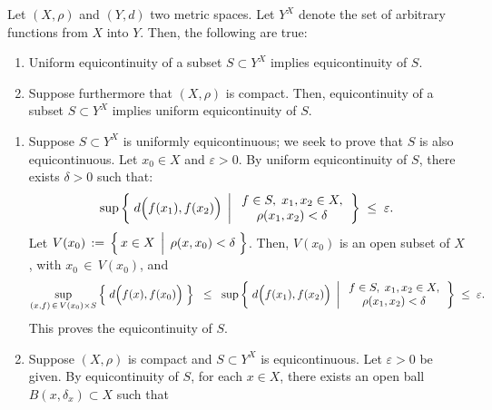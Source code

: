 \begin{proposition}
\mbox{}\vskip 0.2cm
\noindent
Let $(X,\rho)$ and $(Y,d)$ two metric spaces.
Let $Y^{X}$ denote the set of arbitrary functions from $X$ into $Y$.
Then, the following are true:
\begin{enumerate}
\item	Uniform equicontinuity of a subset $S \subset Y^{X}$ implies equicontinuity of $S$.
\item	Suppose furthermore that $(X,\rho)$ is compact.
		Then, equicontinuity of a subset $S \subset Y^{X}$ implies uniform equicontinuity of $S$.
\end{enumerate}
\end{proposition}
\proof
\begin{enumerate}
\item
	Suppose $S \subset Y^{X}$ is uniformly equicontinuous;
	we seek to prove that $S$ is also equicontinuous.
	Let $x_{0} \in X$ and $\varepsilon > 0$.
	By uniform equicontinuity of $S$, there exists $\delta > 0$ such that:
	\begin{equation*}
	\sup\left\{\;
	d\!\left(\overset{{\color{white}.}}{f}(x_{1}),f(x_{2})\right)
	\;\left\vert\;
	\begin{array}{c} f \in S, \; x_{1},x_{2} \in X, \\ \rho(x_{1},x_{2}) < \delta \end{array}
	\right.
	\right\}
	\;\leq\; \varepsilon.
	\end{equation*}
	Let $V(x_{0}) \,:=\, \left\{\,x \in X \;\left\vert\;\, \rho(x,x_{0}) \overset{{\color{white}.}}{<} \delta \right.\,\right\}$.
	Then, $V(x_{0})$ is an open subset of $X$, with $x_{0} \,\in\, V(x_{0})$, and
	\begin{equation*}
	\sup_{(x,f) \,\in\, V(x_{0}) \times S}\left\{\;d\!\left(\overset{{\color{white}.}}{f}(x),f(x_{0})\right)\;\right\}
	\;\; \leq \;\; 
	\sup\left\{\;
	d\!\left(\overset{{\color{white}.}}{f}(x_{1}),f(x_{2})\right)
	\;\left\vert\;
	\begin{array}{c} f \in S, \; x_{1},x_{2} \in X, \\ \rho(x_{1},x_{2}) < \delta \end{array}
	\right.
	\right\}
	\;\leq\; \varepsilon.
	\end{equation*}
	This proves the equicontinuity of $S$.
\item
	Suppose $(X,\rho)$ is compact and $S \subset Y^{X}$ is equicontinuous.
	Let $\varepsilon > 0$ be given.
	By equicontinuity of $S$, for each $x \in X$, there exists an open ball
	$B(x,\delta_{x}) \subset X$ such that

\end{enumerate}
